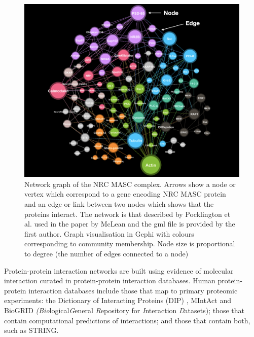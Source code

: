 \begin{figure}
    \centering
    \includegraphics[width=\textwidth]{images/nrc_arrow.png}
        \caption[Network graph of the NRC MASC complex.]{Network graph of the NRC MASC complex. Arrows show a node or vertex which correspond to a gene encoding NRC MASC protein and an edge or link between two nodes which shows that the proteins interact. The network is that described by Pocklington et al. \cite{pocklington2006proteomes} used in the paper by McLean\cite{mclean2016improved} and the gml file is provided by the first author. Graph visualisation in Gephi\cite{bastian2009gephi} with colours corresponding to community membership. Node size is proportional to degree (the number of edges connected to a node)}
    \label{fig:nrcmasc}
\end{figure}


Protein-protein interaction networks are built using evidence of molecular interaction curated in protein-protein interaction databases. Human protein-protein interaction databases include those that map to primary proteomic experiments:   the Dictionary of Interacting Proteins (DIP) \cite{salwinski2004database}, MIntAct\cite{orchard2014mintact} and BioGRID \textit{(Bio}logical\textit{G}eneral \textit{R}epository for \textit{I}nteraction \textit{D}atasets)\cite{chatr2017biogrid}; those that contain computational predictions of interactions; and those that contain both, such as STRING\cite{szklarczyk2019string}.

